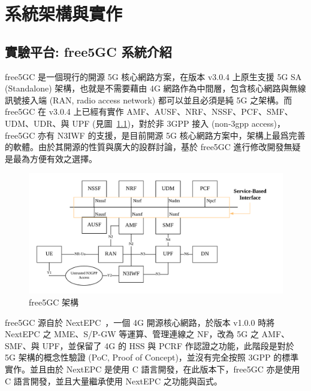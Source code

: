 \chapter{系統架構與實作}
\label{chapter:system}


\section{實驗平台: free5GC 系統介紹}
\label{sec:free5gc_intro}


free5GC 是一個現行的開源 5G 核心網路方案，在版本 v3.0.4 上原生支援 5G SA (Standalone) 架構，也就是不需要藉由 4G 網路作為中間層，包含核心網路與無線訊號接入端 (RAN, radio access network) 都可以並且必須是純 5G 之架構。而 free5GC 在 v3.0.4 上已經有實作 AMF、AUSF、NRF、NSSF、PCF、SMF、UDM、UDR、與 UPF (見圖~\ref{fig:free5gc_arch})，對於非 3GPP 接入 (non-3gpp access)，free5GC 亦有 N3IWF 的支援，是目前開源 5G 核心網路方案中，架構上最爲完善的軟體。由於其開源的性質與廣大的設群討論，基於 free5GC 進行修改開發無疑是最為方便有效之選擇。

\begin{figure}[htbp]
  \centering
  \includegraphics[height=!,width=1\linewidth,keepaspectratio=true]
                    {figures/free5gc-stage-2-arch}
  \caption[free5GC 架構]{{\footnotesize free5GC 架構~\cite{free5gc}}}
  \label{fig:free5gc_arch}
\end{figure}

free5GC 源自於 NextEPC~\cite{nextepc}，一個 4G 開源核心網路，於版本 v1.0.0 時將 NextEPC 之 MME、S/P-GW 等運算、管理連線之 NF，改為 5G 之 AMF、SMF、與 UPF，並保留了 4G 的 HSS 與 PCRF 作認證之功能，此階段是對於 5G 架構的概念性驗證 (PoC, Proof of Concept)，並沒有完全按照 3GPP 的標準實作。並且由於 NextEPC 是使用 C 語言開發，在此版本下，free5GC 亦是使用 C 語言開發，並且大量繼承使用 NextEPC 之功能與函式。

